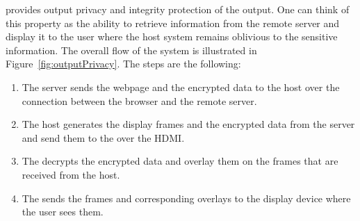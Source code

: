 \name provides output privacy and integrity protection of the output. One can think of this property as the ability to retrieve information from the remote server and display it to the user where the host system remains oblivious to the sensitive information. The overall flow of the system is illustrated in Figure~\ref{fig:outputPrivacy}. The steps are the following:

\begin{enumerate}
  \item[\one] The server sends the webpage and the encrypted data to the host over the \http connection between the browser and the remote server.
  \item[\two] The host generates the display frames and the encrypted data from the server and send them to the \device over the HDMI.
  \item[\three] The \device decrypts the encrypted data and overlay them on the frames that are received from the host.
  \item[\four] The \device sends the frames and corresponding overlays to the display device where the user sees them.
\end{enumerate}









